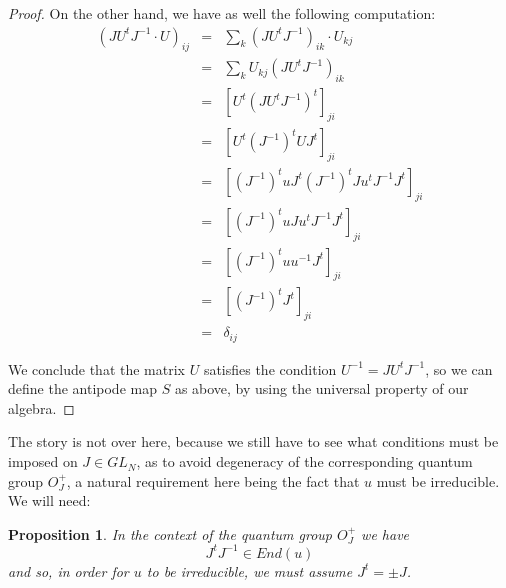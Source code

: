 \documentclass[12pt]{amsbook}
\newtheorem{proposition}[theorem]{Proposition}
\begin{document}
\begin{proof}
On the other hand, we have as well the following computation:
\begin{eqnarray*}
(JU^tJ^{-1}\cdot U)_{ij}
&=&\sum_k(JU^tJ^{-1})_{ik}\cdot U_{kj}\\
&=&\sum_kU_{kj}(JU^tJ^{-1})_{ik}\\
&=&[U^t(JU^tJ^{-1})^t]_{ji}\\
&=&[U^t(J^{-1})^tUJ^t]_{ji}\\
&=&[(J^{-1})^tuJ^t(J^{-1})^tJu^tJ^{-1}J^t]_{ji}\\
&=&[(J^{-1})^tuJu^tJ^{-1}J^t]_{ji}\\
&=&[(J^{-1})^tuu^{-1}J^t]_{ji}\\
&=&[(J^{-1})^tJ^t]_{ji}\\
&=&\delta_{ij}
\end{eqnarray*}

We conclude that the matrix $U$ satisfies the condition $U^{-1}=JU^tJ^{-1}$, so we can define the antipode map $S$ as above, by using the universal property of our algebra.
\end{proof}

The story is not over here, because we still have to see what conditions must be imposed on $J\in GL_N$, as to avoid degeneracy of the corresponding quantum group $O_J^+$, a natural requirement here being the fact that $u$ must be irreducible. We will need:

\begin{proposition}
In the context of the quantum group $O_J^+$ we have
$$J^tJ^{-1}\in End(u)$$
and so, in order for $u$ to be irreducible, we must assume $J^t=\pm J$.
\end{proposition}
\end{document}
